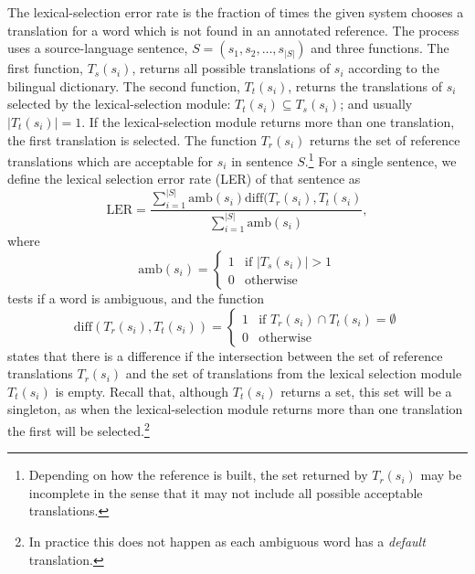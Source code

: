 \documentclass[11pt]{article}
\newcommand{\comment}[1]{\todo{#1}}
\begin{document}
The lexical-selection error rate is the fraction of times the given
system chooses a translation for a word which is not found in an
annotated reference. The process uses a source-language sentence, $S =
(s_1, s_2, \ldots, s_{|S|})$ and three functions. The first function,
$T_s(s_i)$, returns all possible translations of $s_i$ according to
the bilingual dictionary. The second function, $T_t(s_i)$, returns the
translations of $s_i$ selected by the lexical-selection module:
$T_t(s_i) \subseteq T_s(s_i)$; and usually $|T_t(s_i)| = 1$. If the
lexical-selection module returns more than one translation, the first
translation is selected. 
The
function $T_r(s_i)$ returns the set of reference translations which
are acceptable for $s_i$ in sentence $S$.\footnote{Depending on how
  the reference is built, the set returned by $T_r(s_i)$ may be
  incomplete in the sense that it may not include all possible
  acceptable translations.} For a
single sentence, we define the lexical selection error rate (LER) of
that sentence as
\begin{equation}
\mathrm{LER} = \frac{\sum_{i=1}^{|S|} \mathrm{amb}(s_i) \mathrm{diff}(T_r(s_i), T_t(s_i)}{\sum_{i=1}^{|S|} \mathrm{amb}(s_i)},
\label{eq:ler}
\end{equation}
where
\begin{equation}
\mathrm{amb}(s_i) = \left \{ \begin{matrix}
                 1 & \mbox{if } |T_s(s_i)| > 1   \\
                 0 & \mbox{otherwise} \end{matrix} \right.
\label{eq:amb}
\end{equation}
 tests if a word is ambiguous, and the  function 
\begin{equation}
\mathrm{diff}(T_r(s_i), T_t(s_i)) = \left \{ \begin{matrix}
                 1 & \mbox{if } T_r(s_i) \cap T_t(s_i) = \emptyset   \\
                 0 & \mbox{otherwise} \end{matrix} \right.
\label{eq:diff}
\end{equation}
states that there is a difference if the intersection between the set
of reference translations $T_r(s_i)$ and the set of translations from
the lexical selection module $T_t(s_i)$ is empty.  Recall that,
although $T_t(s_i)$ returns a set, this set will be a singleton, as
when the lexical-selection module returns more than one translation
the first will be selected.\footnote{In practice this does not happen
as each ambiguous word has a \emph{default} translation.} 
\end{document}
